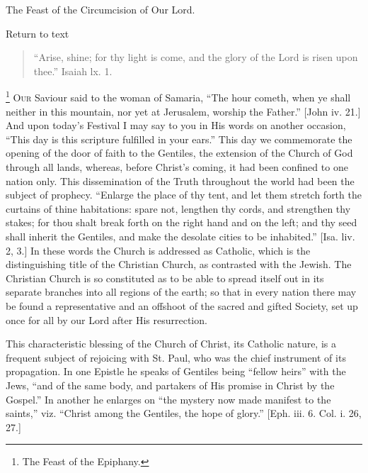 
The Feast of the Circumcision of Our Lord.

Return to text


\begin{quote}

``Arise, shine; for thy light is come, and the glory of the
Lord is risen upon thee.'' Isaiah lx. 1.

\end{quote}

\footnote{The Feast of the Epiphany.} O\textsc{ur} Saviour said to
the woman of Samaria, ``The hour cometh, when ye shall neither in
this mountain, nor yet at Jerusalem, worship the Father.'' [John
iv. 21.] And upon today's Festival I may say to you in His words on
another occasion, ``This day is this scripture fulfilled in your
ears.'' This day we commemorate the opening of the door of faith
to the Gentiles, the extension of the Church of God through all lands,
whereas, before Christ's coming, it had been confined to one nation
only. This dissemination of the Truth throughout the world had been
the subject of prophecy. ``Enlarge the place of thy tent, and let
them stretch forth the curtains of thine habitations: spare not,
lengthen thy cords, and strengthen thy stakes; for thou shalt break
forth on the right hand and on the left; and thy seed shall inherit
the Gentiles, and make the desolate cities to be inhabited.'' [Isa.
liv. 2, 3.] In these words the Church is addressed as Catholic, which
is the distinguishing title of the Christian Church, as contrasted
with the Jewish. The Christian Church is so constituted as to be able
to spread itself out in its separate branches into all regions of the
earth; so that in every nation there may be found a representative and
an offshoot of the sacred and gifted Society, set up once for all by
our Lord after His resurrection.

This characteristic blessing of the Church of Christ, its Catholic
nature, is a frequent subject of rejoicing with St. Paul, who was the
chief instrument of its propagation. In one Epistle he speaks of
Gentiles being ``fellow heirs'' with the Jews, ``and of
the same body, and partakers of His promise in Christ by the
Gospel.'' In another he enlarges on ``the mystery now made
manifest to the saints,'' viz. ``Christ among the Gentiles,
the hope of glory.'' [Eph. iii. 6. Col. i. 26, 27.]

